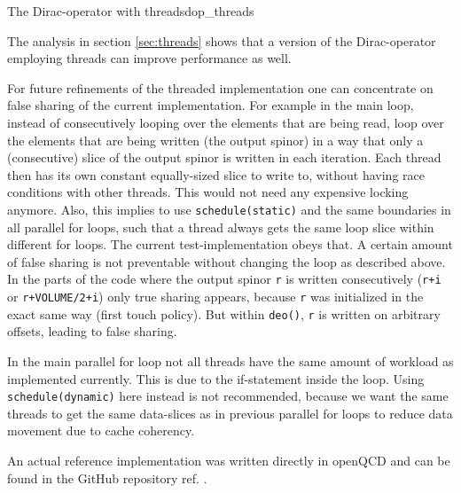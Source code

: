 \documentclass{article}
\theoremstyle{plain} %
\theoremstyle{convention} %
\theoremstyle{remark} %
\def\code#1{\texttt{#1}}
\numberwithin{equation}{section}
\begin{document}
\begin{proposal}{The Dirac-operator with threads}{dop_threads}

The analysis in section \ref{sec:threads} shows that a version of the Dirac-operator employing threads can improve performance as well.

For future refinements of the threaded implementation one can concentrate on false sharing of the current implementation. For example in the main loop, instead of consecutively looping over the elements that are being read, loop over the elements that are being written (the output spinor) in a way that only a (consecutive) slice of the output spinor is written in each iteration. Each thread then has its own constant equally-sized slice to write to, without having race conditions with other threads. This would not need any expensive locking anymore. Also, this implies to use \code{schedule(static)} and the same boundaries in all parallel for loops, such that a thread always gets the same loop slice within different for loops. The current test-implementation obeys that. A certain amount of false sharing is not preventable without changing the loop as described above. In the parts of the code where the output spinor \code{r} is written consecutively (\code{r+i} or \code{r+VOLUME/2+i}) only true sharing appears, because \code{r} was initialized in the exact same way (first touch policy). But within \code{deo()}, \code{r} is written on arbitrary offsets, leading to false sharing.

In the main parallel for loop not all threads have the same amount of workload as implemented currently. This is due to the if-statement inside the loop. Using \code{schedule(dynamic)} here instead is not recommended, because we want the same threads to get the same data-slices as in previous parallel for loops to reduce data movement due to cache coherency.

An actual reference implementation was written directly in openQCD and can be found in the GitHub repository ref. \cite{openqcd_threads}.

\end{proposal}
\end{document}
